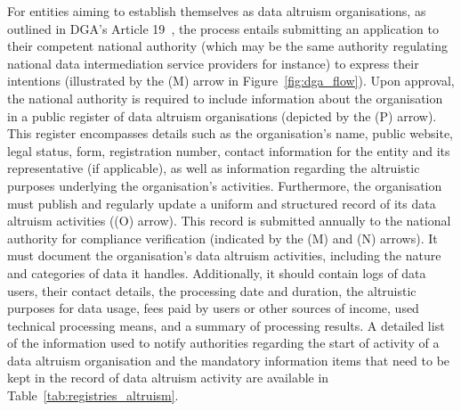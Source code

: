 For entities aiming to establish themselves as data altruism organisations, as outlined in DGA's Article 19~\citeyearpar{noauthor_regulation_2022}, the process entails submitting an application to their competent national authority (which may be the same authority regulating national data intermediation service providers for instance) to express their intentions (illustrated by the (M) arrow in Figure~\ref{fig:dga_flow}).
Upon approval, the national authority is required to include information about the organisation in a public register of data altruism organisations (depicted by the (P) arrow).
This register encompasses details such as the organisation's name, public website, legal status, form, registration number, contact information for the entity and its representative (if applicable), as well as information regarding the altruistic purposes underlying the organisation's activities.
Furthermore, the organisation must publish and regularly update a uniform and structured record of its data altruism activities ((O) arrow).
This record is submitted annually to the national authority for compliance verification (indicated by the (M) and (N) arrows).
It must document the organisation's data altruism activities, including the nature and categories of data it handles.
Additionally, it should contain logs of data users, their contact details, the processing date and duration, the altruistic purposes for data usage, fees paid by users or other sources of income, used technical processing means, and a summary of processing results.
A detailed list of the information used to notify authorities regarding the start of activity of a data altruism organisation and the mandatory information items that need to be kept in the record of data altruism activity are available in Table~\ref{tab:registries_altruism}.


